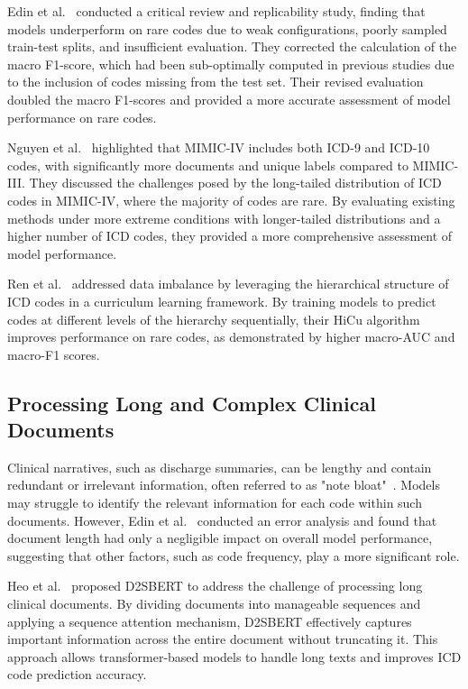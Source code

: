 \documentclass[12pt,a4paper]{report}
\begin{document}
Edin et al.~\cite{edin2023automated} conducted a critical review and replicability study, finding that models underperform on rare codes due to weak configurations, poorly sampled train-test splits, and insufficient evaluation. They corrected the calculation of the macro F1-score, which had been sub-optimally computed in previous studies due to the inclusion of codes missing from the test set. Their revised evaluation doubled the macro F1-scores and provided a more accurate assessment of model performance on rare codes.

Nguyen et al.~\cite{nguyen2023mimic} highlighted that MIMIC-IV includes both ICD-9 and ICD-10 codes, with significantly more documents and unique labels compared to MIMIC-III. They discussed the challenges posed by the long-tailed distribution of ICD codes in MIMIC-IV, where the majority of codes are rare. By evaluating existing methods under more extreme conditions with longer-tailed distributions and a higher number of ICD codes, they provided a more comprehensive assessment of model performance.

Ren et al.~\cite{ren2022hicu} addressed data imbalance by leveraging the hierarchical structure of ICD codes in a curriculum learning framework. By training models to predict codes at different levels of the hierarchy sequentially, their HiCu algorithm improves performance on rare codes, as demonstrated by higher macro-AUC and macro-F1 scores.

\subsection{Processing Long and Complex Clinical Documents}

Clinical narratives, such as discharge summaries, can be lengthy and contain redundant or irrelevant information, often referred to as "note bloat"~\cite{wrenn2010quantifying}. Models may struggle to identify the relevant information for each code within such documents. However, Edin et al.~\cite{edin2023automated} conducted an error analysis and found that document length had only a negligible impact on overall model performance, suggesting that other factors, such as code frequency, play a more significant role.

Heo et al.~\cite{heo2022medical} proposed D2SBERT to address the challenge of processing long clinical documents. By dividing documents into manageable sequences and applying a sequence attention mechanism, D2SBERT effectively captures important information across the entire document without truncating it. This approach allows transformer-based models to handle long texts and improves ICD code prediction accuracy.
\end{document}
